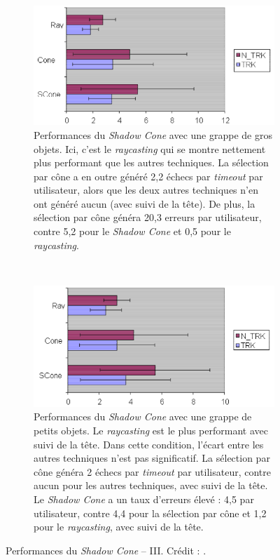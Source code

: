 		
	\begin{figure}[!htb]
		\begin{subfigure}[t]{0.49\textwidth}
			\centering
			\includegraphics[width=\textwidth]{figures/ch2/shadowCLarge}
			\caption{Performances du \emph{Shadow Cone} avec une grappe de gros objets. Ici, c'est le \emph{raycasting} qui se montre nettement plus performant que les autres techniques. La sélection par cône a en outre généré 2,2 échecs par \emph{timeout} par utilisateur, alors que les deux autres techniques n'en ont généré aucun (avec suivi de la tête). De plus, la sélection par cône généra 20,3 erreurs par utilisateur, contre 5,2 pour le \emph{Shadow Cone} et 0,5 pour le \emph{raycasting}.}
			\label{fig:shadowCLarge}
		\end{subfigure}
		~
		\begin{subfigure}[t]{0.49\textwidth}
			\centering
			\includegraphics[width=\textwidth]{figures/ch2/shadowCSmall}
			\caption{Performances du \emph{Shadow Cone} avec une grappe de petits objets. Le \emph{raycasting} est le plus performant avec suivi de la tête. Dans cette condition, l'écart entre les autres techniques n'est pas significatif. La sélection par cône généra 2 échecs par \emph{timeout} par utilisateur, contre aucun pour les autres techniques, avec suivi de la tête. Le \emph{Shadow Cone} a un taux d'erreurs élevé : 4,5 par utilisateur, contre 4,4 pour la sélection par cône et 1,2 pour le \emph{raycasting}, avec suivi de la tête.}
			\label{fig:shadowCSmall}
		\end{subfigure}
		\caption[Performances du \emph{Shadow Cone} -- III]{Performances du \emph{Shadow Cone} -- III. Crédit : \cite{steed20043d}.}
		\label{fig:shadowConePerf3}
	\end{figure}
	
